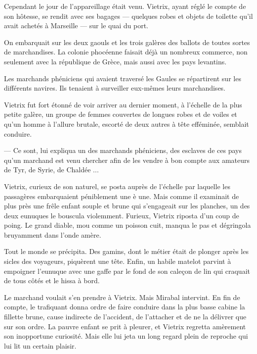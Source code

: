 \documentclass[a4paper, 11pt, oneside, polutonikogreek, french]{article}
\begin{document}
\bigskip
\centerline{\EightStarTaper}
\centerline{\EightStarTaper\EightStarTaper}
\bigskip

Cependant le jour de l'appareillage était venu. Vietrix, ayant réglé le compte de son hôtesse, se rendit avec ses bagages --- quelques robes et objets de toilette qu'il avait achetés à Marseille --- sur le quai du port.

On embarquait sur les deux gaouls et les trois galères des ballots de toutes sortes de marchandises. La colonie phocéenne faisait déjà un nombreux commerce, non seulement avec la république de Grèce, mais aussi avec les pays levantins.

Les marchands phéniciens qui avaient traversé les Gaules se répartirent sur les différents navires. Ils tenaient à surveiller eux-mêmes leurs marchandises.

Vietrix fut fort étonné de voir arriver au dernier moment, à l'échelle de la plus petite galère, un groupe de femmes couvertes de longues robes et de voiles et qu'un homme à l'allure brutale, escorté de deux autres à tête efféminée, semblait conduire.

--- Ce sont, lui expliqua un des marchands phéniciens, des esclaves de ces pays qu'un marchand est venu chercher afin de les vendre à bon compte aux amateurs de Tyr, de Syrie, de Chaldée ...

Vietrix, curieux de son naturel, se posta auprès de l'échelle par laquelle les passagères embarquaient péniblement une è une. Mais comme il examinait de plus près une frêle enfant souple et brune qui s'engageait sur les planches, un des deux eunuques le bouscula violemment. Furieux, Vietrix riposta d'un coup de poing. Le grand diable, mou comme un poisson cuit, manqua le pas et dégringola bruyamment dans l'onde amère.

Tout le monde se précipita. Des gamins, dont le métier était de plonger après les sicles des voyageurs, piquèrent une tête. Enfin, un habile matelot parvint à empoigner l'eunuque avec une gaffe par le fond de son caleçon de lin qui craquait de tous côtés et le hissa à bord.

Le marchand voulait s'en prendre à Vietrix. Mais Mirabal intervint. En fin de compte, le trafiquant donna ordre de faire conduire dans la plus basse cabine la fillette brune, cause indirecte de l'accident, de l'attacher et de ne la délivrer que sur son ordre. La pauvre enfant se prit à pleurer, et Vietrix regretta amèrement son inopportune curiosité. Mais elle lui jeta un long regard plein de reproche qui lui lit un certain plaisir.
\end{document}
